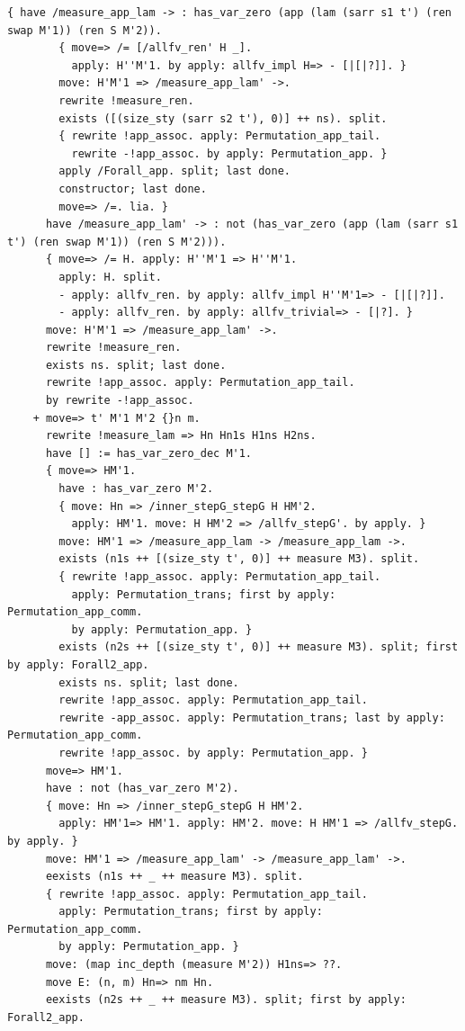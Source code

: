 \documentclass[10pt,a4paper]{article}
\begin{document}
\begin{lstlisting}[style=authorcoq]
      { have /measure_app_lam -> : has_var_zero (app (lam (sarr s1 t') (ren swap M'1)) (ren S M'2)).
        { move=> /= [/allfv_ren' H _].
          apply: H''M'1. by apply: allfv_impl H=> - [|[|?]]. }
        move: H'M'1 => /measure_app_lam' ->.
        rewrite !measure_ren.
        exists ([(size_sty (sarr s2 t'), 0)] ++ ns). split.
        { rewrite !app_assoc. apply: Permutation_app_tail.
          rewrite -!app_assoc. by apply: Permutation_app. }
        apply /Forall_app. split; last done.
        constructor; last done.
        move=> /=. lia. }
      have /measure_app_lam' -> : not (has_var_zero (app (lam (sarr s1 t') (ren swap M'1)) (ren S M'2))).
      { move=> /= H. apply: H''M'1 => H''M'1.
        apply: H. split.
        - apply: allfv_ren. by apply: allfv_impl H''M'1=> - [|[|?]].
        - apply: allfv_ren. by apply: allfv_trivial=> - [|?]. }
      move: H'M'1 => /measure_app_lam' ->.
      rewrite !measure_ren.
      exists ns. split; last done.
      rewrite !app_assoc. apply: Permutation_app_tail.
      by rewrite -!app_assoc.
    + move=> t' M'1 M'2 {}n m.
      rewrite !measure_lam => Hn Hn1s H1ns H2ns.
      have [] := has_var_zero_dec M'1.
      { move=> HM'1.
        have : has_var_zero M'2.
        { move: Hn => /inner_stepG_stepG H HM'2.
          apply: HM'1. move: H HM'2 => /allfv_stepG'. by apply. }
        move: HM'1 => /measure_app_lam -> /measure_app_lam ->.
        exists (n1s ++ [(size_sty t', 0)] ++ measure M3). split.
        { rewrite !app_assoc. apply: Permutation_app_tail.
          apply: Permutation_trans; first by apply: Permutation_app_comm.
          by apply: Permutation_app. }
        exists (n2s ++ [(size_sty t', 0)] ++ measure M3). split; first by apply: Forall2_app.
        exists ns. split; last done.
        rewrite !app_assoc. apply: Permutation_app_tail.
        rewrite -app_assoc. apply: Permutation_trans; last by apply: Permutation_app_comm.
        rewrite !app_assoc. by apply: Permutation_app. }
      move=> HM'1.
      have : not (has_var_zero M'2).
      { move: Hn => /inner_stepG_stepG H HM'2.
        apply: HM'1=> HM'1. apply: HM'2. move: H HM'1 => /allfv_stepG. by apply. }
      move: HM'1 => /measure_app_lam' -> /measure_app_lam' ->.
      eexists (n1s ++ _ ++ measure M3). split.
      { rewrite !app_assoc. apply: Permutation_app_tail.
        apply: Permutation_trans; first by apply: Permutation_app_comm.
        by apply: Permutation_app. }
      move: (map inc_depth (measure M'2)) H1ns=> ??.
      move E: (n, m) Hn=> nm Hn.
      eexists (n2s ++ _ ++ measure M3). split; first by apply: Forall2_app.

\end{lstlisting}
\end{document}
